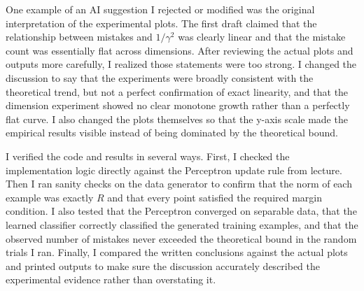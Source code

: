 \documentclass{article}
\begin{document}
One example of an AI suggestion I rejected or modified was the original interpretation of the experimental plots. The first draft claimed that the relationship between mistakes and \(1/\gamma^2\) was clearly linear and that the mistake count was essentially flat across dimensions. After reviewing the actual plots and outputs more carefully, I realized those statements were too strong. I changed the discussion to say that the experiments were broadly consistent with the theoretical trend, but not a perfect confirmation of exact linearity, and that the dimension experiment showed no clear monotone growth rather than a perfectly flat curve. I also changed the plots themselves so that the y-axis scale made the empirical results visible instead of being dominated by the theoretical bound.

I verified the code and results in several ways. First, I checked the implementation logic directly against the Perceptron update rule from lecture. Then I ran sanity checks on the data generator to confirm that the norm of each example was exactly \(R\) and that every point satisfied the required margin condition. I also tested that the Perceptron converged on separable data, that the learned classifier correctly classified the generated training examples, and that the observed number of mistakes never exceeded the theoretical bound in the random trials I ran. Finally, I compared the written conclusions against the actual plots and printed outputs to make sure the discussion accurately described the experimental evidence rather than overstating it.
\end{document}
